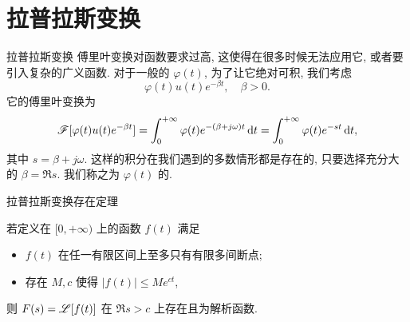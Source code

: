 \section{拉普拉斯变换}


\begin{frame}{拉普拉斯变换}
\onslide<+->
傅里叶变换对函数要求过高, 这使得在很多时候无法应用它, 或者要引入复杂的广义函数.
\onslide<+->
对于一般的 $\varphi(t)$, 为了让它绝对可积, 我们考虑
\[\varphi(t)u(t)e^{-\beta t},\quad\beta>0.\]
\onslide<+->
它的傅里叶变换为
\[\mathscr{F}[\varphi(t)u(t)e^{-\beta t}]=\int_0^{+\infty}\varphi(t)e^{-(\beta+j\omega)t}\,\mathrm{d} t=\int_0^{+\infty}\varphi(t)e^{-st}\,\mathrm{d} t,\]
其中 $s=\beta+j\omega$.
\onslide<+->
这样的积分在我们遇到的多数情形都是存在的, 只要选择充分大的 $\beta=\Re s$.
\onslide<+->
我们称之为 $\varphi(t)$ 的.
\end{frame}


\begin{frame}{拉普拉斯变换存在定理}
\begin{theorem}[拉普拉斯变换存在定理]
若定义在 $[0,+\infty)$ 上的函数 $f(t)$ 满足
\begin{itemize}
\item $f(t)$ 在任一有限区间上至多只有有限多间断点;
\item 存在 $M,c$ 使得 $|f(t)|\le Me^{ct}$,
\end{itemize}
\onslide<+->
则 $F(s)=\mathscr{L}[f(t)]$ 在 $\Re s>c$ 上存在且为解析函数.
\end{theorem}
\onslide<+->
\begin{center}
\end{center}
\end{frame}


